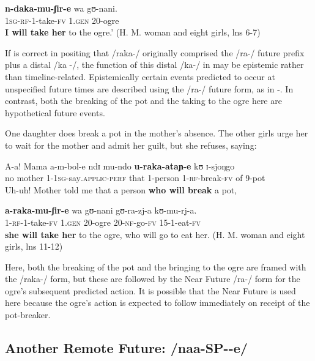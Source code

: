 \documentclass[output=paper]{langsci/langscibook}
\begin{document}
\gll \textbf{n-daka-mu-ʃir-e}   wa   gʊ-nani. \\
\textsc{1sg-rf-}1-take-\textsc{fv}  1.\textsc{gen}  20-ogre \\
\glt \textbf{I will take her} to the ogre.’ (H. M. woman and eight girls, lns 6-7)
\z

If \citet{Botne1999} is correct in positing that /raka-/ originally comprised the /ra-/ future prefix plus a distal /ka%
%
-/, the function of this distal /ka-/ in  may be epistemic rather than timeline-related. Epistemically certain events predicted to occur at unspecified future times are described using the /ra-/ future form, as in -. In contrast, both the breaking of the pot and the taking to the ogre here are hypothetical future events. 

One daughter does break a pot in the mother’s absence. The other girls urge her to wait for the mother and admit her guilt, but she refuses, saying:

\ea\label{ex:sarvasy:15}
\gll A-a!  Mama    a-m-bol-e      ndɪ   mu-ndo   \textbf{u-raka-ataɲ-e}   kʊ   ɪ-sjoŋgo  \\
no  mother  1-1\textsc{sg}-say\textsc{.applic-perf}  that  1-person  1\textsc{-rf}-break-\textsc{fv}  of  9-pot\\
\glt Uh-uh! Mother told me that a person \textbf{who will break} a pot,

\gll \textbf{a-raka-mu-ʃir-e}   wa   gʊ-nani  gʊ-ra-zj-a  kʊ-mu-rj-a.\\
1\textsc{-rf-}1-take-\textsc{fv}    1.\textsc{gen}  20-ogre  20-\textsc{nf}-go-\textsc{fv}  15-1-eat-\textsc{fv} \\
\glt \textbf{she will take her} to the ogre, who will go to eat her. (H. M. woman and eight girls, lns 11-12)
\z

Here, both the breaking of the pot and the bringing to the ogre are framed with the /raka-/ form, but these are followed by the Near Future /ra-/ form for the ogre’s subsequent predicted action. It is possible that the Near Future is used here because the ogre’s action is expected to follow immediately on receipt of the pot-breaker.

\subsection{Another Remote Future: /naa-SP-{\longrule}-e/}\label{sec:sarvasy:6.2}
\end{document}
